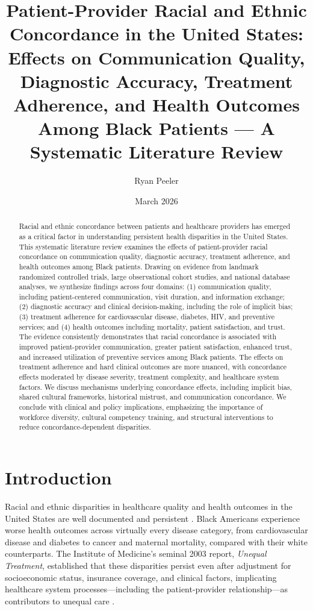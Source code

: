 \documentclass[12pt]{article}
\title{Patient-Provider Racial and Ethnic Concordance in the United States: Effects on Communication Quality, Diagnostic Accuracy, Treatment Adherence, and Health Outcomes Among Black Patients --- A Systematic Literature Review}
\author{Ryan Peeler}
\date{March 2026}
\begin{document}
\maketitle

\begin{abstract}
Racial and ethnic concordance between patients and healthcare providers has emerged as a critical factor in understanding persistent health disparities in the United States. This systematic literature review examines the effects of patient-provider racial concordance on communication quality, diagnostic accuracy, treatment adherence, and health outcomes among Black patients. Drawing on evidence from landmark randomized controlled trials, large observational cohort studies, and national database analyses, we synthesize findings across four domains: (1) communication quality, including patient-centered communication, visit duration, and information exchange; (2) diagnostic accuracy and clinical decision-making, including the role of implicit bias; (3) treatment adherence for cardiovascular disease, diabetes, HIV, and preventive services; and (4) health outcomes including mortality, patient satisfaction, and trust. The evidence consistently demonstrates that racial concordance is associated with improved patient-provider communication, greater patient satisfaction, enhanced trust, and increased utilization of preventive services among Black patients. The effects on treatment adherence and hard clinical outcomes are more nuanced, with concordance effects moderated by disease severity, treatment complexity, and healthcare system factors. We discuss mechanisms underlying concordance effects, including implicit bias, shared cultural frameworks, historical mistrust, and communication concordance. We conclude with clinical and policy implications, emphasizing the importance of workforce diversity, cultural competency training, and structural interventions to reduce concordance-dependent disparities.
\end{abstract}

\section{Introduction}

Racial and ethnic disparities in healthcare quality and health outcomes in the United States are well documented and persistent \citep{smedley2003}. Black Americans experience worse health outcomes across virtually every disease category, from cardiovascular disease and diabetes to cancer and maternal mortality, compared with their white counterparts. The Institute of Medicine's seminal 2003 report, \emph{Unequal Treatment}, established that these disparities persist even after adjustment for socioeconomic status, insurance coverage, and clinical factors, implicating healthcare system processes---including the patient-provider relationship---as contributors to unequal care \citep{smedley2003}.
\end{document}
